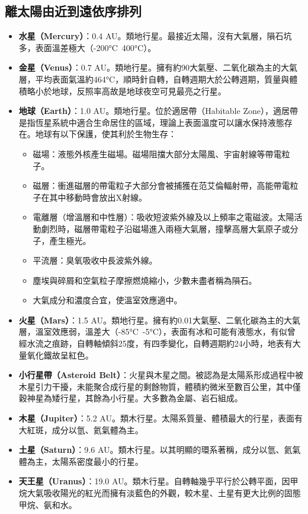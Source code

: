 \documentclass[a4paper,12pt]{report}
\begin{document}
\subsection{離太陽由近到遠依序排列}
\begin{itemize}
    \item \textbf{水星（Mercury）}：0.4 AU。類地行星。最接近太陽，沒有大氣層，隕石坑多，表面溫差極大（-200°C~400°C）。
    \item \textbf{金星（Venus）}：0.7 AU。類地行星。擁有約90大氣壓、二氧化碳為主的大氣層，平均表面氣溫約464°C，順時針自轉，自轉週期大於公轉週期，質量與體積略小於地球，反照率高故是地球夜空可見最亮之行星。
    \item \textbf{地球（Earth）}：1.0 AU。類地行星。位於適居帶（Habitable Zone），適居帶是指恆星系統中適合生命居住的區域，理論上表面溫度可以讓水保持液態存在。地球有以下保護，使其利於生物生存：
    \begin{itemize}
    \item 磁場：液態外核產生磁場。磁場阻擋大部分太陽風、宇宙射線等帶電粒子。
    \item 磁層：衝進磁層的帶電粒子大部分會被捕獲在范艾倫輻射帶，高能帶電粒子在其中移動時會放出X射線。
    \item 電離層（增溫層和中性層）：吸收短波紫外線及以上頻率之電磁波。太陽活動劇烈時，磁層帶電粒子沿磁場進入兩極大氣層，撞擊高層大氣原子或分子，產生極光。
    \item 平流層：臭氧吸收中長波紫外線。
\item 塵埃與碎屑和空氣粒子摩擦燃燒縮小，少數未盡者稱為隕石。
\item 大氣成分和濃度合宜，使溫室效應適中。
\end{itemize}
    \item \textbf{火星（Mars）}：1.5 AU。類地行星。擁有約0.01大氣壓、二氧化碳為主的大氣層，溫室效應弱，溫差大（-85°C~-5°C），表面有冰和可能有液態水，有似曾經水流之痕跡，自轉軸傾斜25度，有四季變化，自轉週期約24小時，地表有大量氧化鐵故呈紅色。
    \item \textbf{小行星帶（Asteroid Belt）}：火星與木星之間。被認為是太陽系形成過程中被木星引力干擾，未能聚合成行星的剩餘物質，體積約微米至數百公里，其中僅穀神星為矮行星，其餘為小行星。大多數為金屬、岩石組成。
    \item \textbf{木星（Jupiter）}：5.2 AU。類木行星。太陽系質量、體積最大的行星，表面有大紅斑，成分以氫、氦氣體為主。
    \item \textbf{土星（Saturn）}：9.6 AU。類木行星。以其明顯的環系著稱，成分以氫、氦氣體為主，太陽系密度最小的行星。
    \item \textbf{天王星（Uranus）}：19.0 AU。類木行星。自轉軸幾乎平行於公轉平面，因甲烷大氣吸收陽光的紅光而擁有淡藍色的外觀，較木星、土星有更大比例的固態甲烷、氨和水。

\end{itemize}
\end{document}
